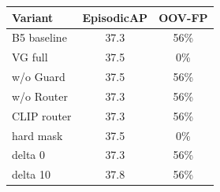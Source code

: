 \begin{tabular}{lcc}
\toprule
Variant & EpisodicAP & OOV-FP \\
\midrule
B5 baseline & 37.3 & 56\% \\
VG full & 37.5 & 0\% \\
w/o Guard & 37.5 & 56\% \\
w/o Router & 37.3 & 56\% \\
CLIP router & 37.3 & 56\% \\
hard mask & 37.5 & 0\% \\
delta 0 & 37.3 & 56\% \\
delta 10 & 37.8 & 56\% \\
\bottomrule
\end{tabular}
